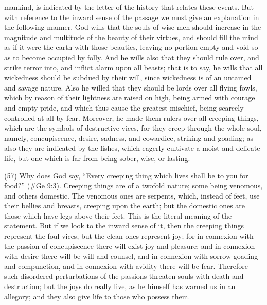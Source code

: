 mankind, is indicated by the letter of the history that relates these events. But with reference to the
inward sense of the passage we must give an explanation in the following manner. God wills that
the souls of wise men should increase in the magnitude and multitude of the beauty of their virtues,
and should fill the mind as if it were the earth with those beauties, leaving no portion empty and void
so as to become occupied by folly. And he wills also that they should rule over, and strike terror
into, and inflict alarm upon all beasts; that is to say, he wills that all wickedness should be subdued
by their will, since wickedness is of an untamed and savage nature. Also he willed that they should
be lords over all flying fowls, which by reason of their lightness are raised on high, being armed with
courage and empty pride, and which thus cause the greatest mischief, being scarcely controlled at
all by fear. Moreover, he made them rulers over all creeping things, which are the symbols of
destructive vices, for they creep through the whole soul, namely, concupiscence, desire, sadness,
and cowardice, striking and goading; as also they are indicated by the fishes, which eagerly
cultivate a moist and delicate life, but one which is far from being sober, wise, or lasting.

(57) Why does God say, ``Every creeping thing which lives shall be to you for food?'' (\#Ge 9:3).
Creeping things are of a twofold nature; some being venomous, and others domestic. The
venomous ones are serpents, which, instead of feet, use their bellies and breasts, creeping upon
the earth; but the domestic ones are those which have legs above their feet. This is the literal
meaning of the statement. But if we look to the inward sense of it, then the creeping things
represent the foul vices, but the clean ones represent joy; for in connexion with the passion of
concupiscence there will exist joy and pleasure; and in connexion with desire there will be will and
counsel, and in connexion with sorrow goading and compunction, and in connexion with avidity
there will be fear. Therefore such disordered perturbations of the passions threaten souls with
death and destruction; but the joys do really live, as he himself has warned us in an allegory; and
they also give life to those who possess them.

